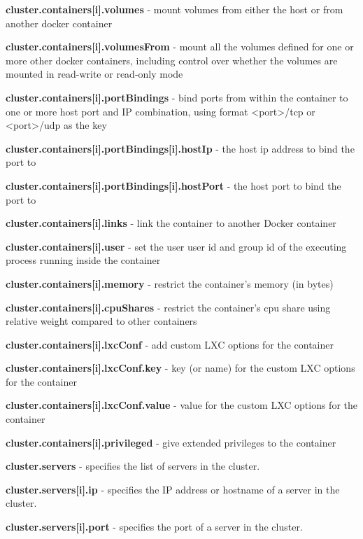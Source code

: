\documentclass[a4paper,11pt,twoside]{report}
\begin{document}
\begin{list}{-}{}
  \item\textbf{{cluster.containers[i].volumes}} - mount volumes from either the host or from another docker container
  \item\textbf{{cluster.containers[i].volumesFrom}} - mount all the volumes defined for one or more other docker containers, including control over whether the volumes are mounted in read-write or read-only mode
  \item\textbf{{cluster.containers[i].portBindings}} - bind ports from within the container to one or more host port and IP combination, using format <port>/tcp or <port>/udp as the key
  \item\textbf{{cluster.containers[i].portBindings[i].hostIp}} - the host ip address to bind the port to
  \item\textbf{{cluster.containers[i].portBindings[i].hostPort}} - the host port to bind the port to
  \item\textbf{{cluster.containers[i].links}} - link the container to another Docker container
  \item\textbf{{cluster.containers[i].user}} - set the user user id and group id of the executing process running inside the container
  \item\textbf{{cluster.containers[i].memory}} - restrict the container's memory (in bytes)
  \item\textbf{{cluster.containers[i].cpuShares}} - restrict the container's cpu share using relative weight compared to other containers
  \item\textbf{{cluster.containers[i].lxcConf}} - add custom LXC options for the container
  \item\textbf{{cluster.containers[i].lxcConf.key}} - key (or name) for the custom LXC options for the container
  \item\textbf{{cluster.containers[i].lxcConf.value}} - value for the custom LXC options for the container
  \item\textbf{{cluster.containers[i].privileged}} - give extended privileges to the container
  
  \item\textbf{{cluster.servers}} - specifies the list of servers in the cluster.
  
  \item\textbf{{cluster.servers[i].ip}} - specifies the IP address or hostname of a server in the cluster.
  
  \item\textbf{{cluster.servers[i].port}} - specifies the port of a server in the cluster.
  

\end{list}
\end{document}
